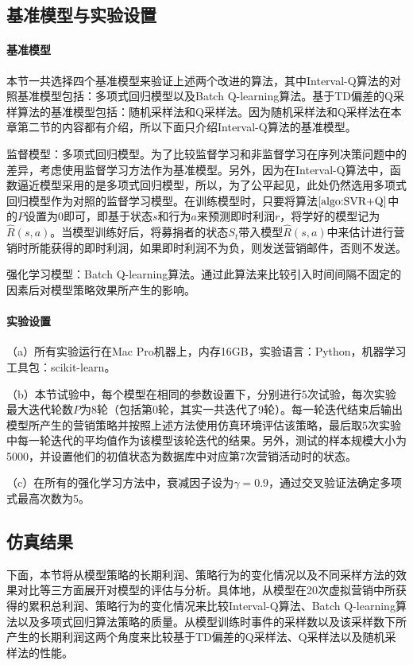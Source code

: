 \subsection{基准模型与实验设置}
\paragraph{基准模型}
本节一共选择四个基准模型来验证上述两个改进的算法，其中Interval-Q算法的对照基准模型包括：多项式回归模型以及Batch Q-learning算法\citep{pednault2002sequential}。基于TD偏差的Q采样算法的基准模型包括：随机采样法和Q采样法。因为随机采样法和Q采样法在本章第二节的内容都有介绍，所以下面只介绍Interval-Q算法的基准模型。

监督模型：多项式回归模型。为了比较监督学习和非监督学习在序列决策问题中的差异，考虑使用监督学习方法作为基准模型。另外，因为在Interval-Q算法中，函数逼近模型采用的是多项式回归模型，所以，为了公平起见，此处仍然选用多项式回归模型作为对照的监督学习模型。在训练模型时，只要将算法$\ref{algo:SVR+Q}$中的$P$设置为0即可，即基于状态$s$和行为$a$来预测即时利润$r$，将学好的模型记为$\hat{R}(s,a)$。当模型训练好后，将募捐者的状态$S_{t}$带入模型$\hat{R}(s,a)$中来估计进行营销时所能获得的即时利润，如果即时利润不为负，则发送营销邮件，否则不发送。

强化学习模型：Batch Q-learning算法。通过此算法来比较引入时间间隔不固定的因素后对模型策略效果所产生的影响。


\paragraph{实验设置}
（a）所有实验运行在Mac Pro机器上，内存16GB，实验语言：Python，机器学习工具包：scikit-learn。

（b）本节试验中，每个模型在相同的参数设置下，分别进行5次试验，每次实验最大迭代轮数$P$为8轮（包括第0轮，其实一共迭代了9轮）。每一轮迭代结束后输出模型所产生的营销策略并按照上述方法使用仿真环境评估该策略，最后取5次实验中每一轮迭代的平均值作为该模型该轮迭代的结果。另外，测试的样本规模大小为5000，并设置他们的初值状态为数据库中对应第7次营销活动时的状态。

（c）在所有的强化学习方法中，衰减因子设为$\gamma=0.9$，通过交叉验证法确定多项式最高次数为5。


\subsection{仿真结果}
下面，本节将从模型策略的长期利润、策略行为的变化情况以及不同采样方法的效果对比等三方面展开对模型的评估与分析。具体地，从模型在20次虚拟营销中所获得的累积总利润、策略行为的变化情况来比较Interval-Q算法、Batch Q-learning算法以及多项式回归算法策略的质量。从模型训练时事件的采样数以及该采样数下所产生的长期利润这两个角度来比较基于TD偏差的Q采样法、Q采样法以及随机采样法的性能。

